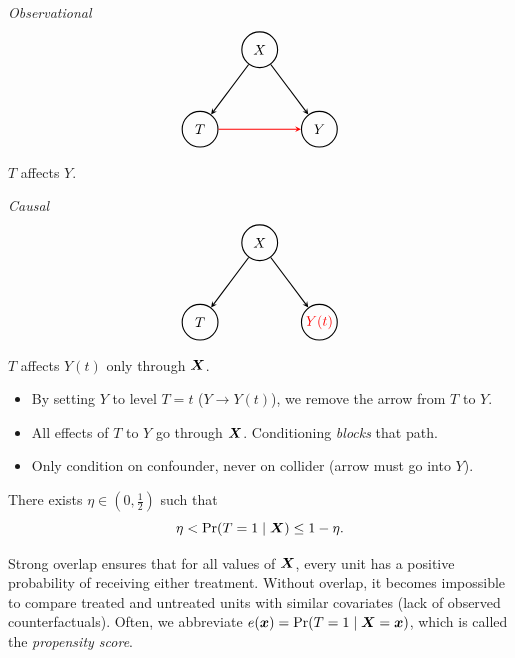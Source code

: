 \documentclass[11pt]{exam}
\begin{document}
    \begin{center}
\begin{minipage}{0.47\linewidth}
\centering
\textit{Observational}
\[
\begin{tikzpicture}[
    >=stealth,
    line width=0.8pt,
    every node/.style={circle, draw, minimum size=9mm, inner sep=0pt}
]
  \node (T) at (1,0)      {$T$};
  \node (Y) at (4,0)    {$Y$};
  \node (X) at (2.5, 2) {$X$};

  \draw[->] (X) -- (Y);
  \draw[->] (X) -- (T);
  \draw[->, red] (T) -- (Y);
\end{tikzpicture}
\]
$T$ affects $Y$.
\end{minipage}\hfill
\begin{minipage}{0.47\linewidth}
\centering
\textit{Causal}
\[
\begin{tikzpicture}[
    >=stealth,
    line width=0.8pt,
    every node/.style={circle, draw, minimum size=9mm, inner sep=0pt}
]
  \node (T) at (1,0)      {$T$};
  \node (Y) at (4,0)    {\textcolor{red}{$Y(t)$}};
  \node (X) at (2.5, 2) {$X$};

  \draw[->] (X) -- (Y);
  \draw[->] (X) -- (T);
\end{tikzpicture}
\]
$T$ affects $Y(t)$ only through $\bm{X}$.
\end{minipage}
\end{center}
\vspace{0.5em}
\begin{itemize}
    \item By setting $Y$ to level $T = t$ ($Y \to Y(t)$), we remove the arrow from $T$ to $Y$.
    \item All effects of $T$ to $Y$ go through $\bm{X}$.  Conditioning \emph{blocks} that path.
    \item Only condition on confounder, never on collider (arrow must go into $Y$).
\end{itemize}

\begin{assumption}\label{ass:strong_overlap}
    There exists $\eta \in (0, \frac{1}{2})$ such that
    \[
    \eta < \Pr(T = 1 \mid \bm{X}) \leq 1 - \eta.
    \]
    \noindent 
\end{assumption}
Strong overlap ensures that for all values of $\bm{X}$, every unit has a positive probability of receiving either treatment. Without overlap, it becomes impossible to compare treated and untreated units with similar covariates (lack of observed counterfactuals). Often, we abbreviate $e(\bm{x}) = \Pr(T = 1\mid \bm{X} = \bm{x})$, which is called the \emph{propensity score}.
\end{document}
